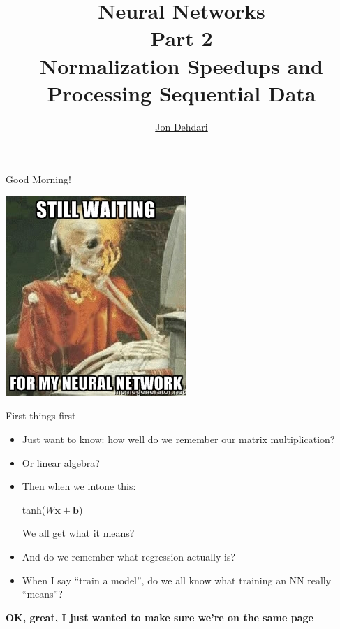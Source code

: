 \documentclass[xcolor=pdftex,x11names,table,hyperref]{beamer}
\begin{document}
\title{Neural Networks \\[1.5em]
 \small{Part 2} \\[1.0em]
 Normalization Speedups and Processing Sequential Data \\[1.0em]
 }
\author{\href{http://jon.dehdari.org}{Jon Dehdari}}
\frame{\titlepage}

\begin{frame}{Good Morning!}
	\begin{center}
	\includegraphics[height=0.55\textheight]{images/skel_nn.jpg}
	\end{center}
\end{frame}


\begin{frame}{First things first}
  \begin{itemize}
  \item Just want to know: how well do we remember our matrix multiplication?\pause
  \item Or linear algebra?\pause
  \item Then when we intone this:
    \begin{center}
    tanh($W\mathbf{x} + \mathbf{b}$)
    \end{center}
    We all get what it means?\pause
  \item And do we remember what regression actually is?\pause
  \item When I say ``train a model'', do we all know what training an NN really ``means''?\pause
  \end{itemize}

  \begin{center}
    \textbf{OK, great, I just wanted to make sure we're on the same page}
  \end{center}

\end{frame}
\end{document}
